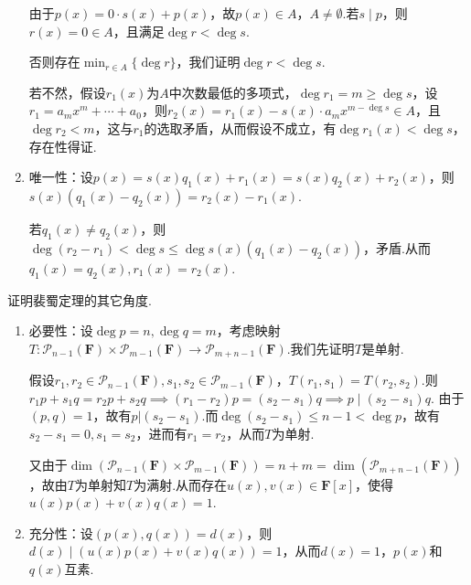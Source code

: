\begin{exercise}
\begin{exgroup}
\begin{answer}
\begin{enumerate}
                由于$p(x)=0\cdot s(x)+p(x)$，故$p(x)\in A$，$A\neq \emptyset$.若$s\mid p$，则$r(x)=0\in A$，且满足$\deg r<\deg s$.

                否则存在$\displaystyle \min_{r\in A}\{\deg r\}$，我们证明$\deg r<\deg s$.

                若不然，假设$r_1(x)$为$A$中次数最低的多项式，$\deg r_1=m\ge \deg s$，设$r_1=a_mx^m+\cdots+a_0$，则$r_2(x)=r_1(x)-s(x)\cdot a_mx^{m-\deg s}\in A$，且$\deg r_2 <m$，这与$r_1$的选取矛盾，从而假设不成立，有$\deg r_1(x)<\deg s$，存在性得证.
                \item 唯一性：设$p(x)=s(x)q_1(x)+r_1(x)=s(x)q_2(x)+r_2(x)$，则$s(x)(q_1(x)-q_2(x))=r_2(x)-r_1(x)$.

                若$q_1(x)\neq q_2(x)$，则$\deg (r_2-r_1)<\deg s\le \deg s(x)(q_1(x)-q_2(x))$，矛盾.从而$q_1(x)=q_2(x),r_1(x)=r_2(x)$.
            \end{enumerate}
        \end{answer}
        \item 证明裴蜀定理的其它角度.
        \begin{answer}
            \begin{enumerate}
                \item 必要性：设$\deg p=n,\deg q=m$，考虑映射$T:\mathcal{P}_{n-1}(\mathbf{F})\times\mathcal{P}_{m-1}(\mathbf{F})\rightarrow \mathcal{P}_{m+n-1}(\mathbf{F})$.我们先证明$T$是单射.

                假设$r_1,r_2\in\mathcal{P}_{n-1}(\mathbf{F}),s_1,s_2\in\mathcal{P}_{m-1}(\mathbf{F})$，$T(r_1,s_1)=T(r_2,s_2)$.则$r_1p+s_1q=r_2p+s_2q \implies (r_1-r_2)p=(s_2-s_1)q\implies p\mid(s_2-s_1)q$.
                由于$(p,q)=1$，故有$p|(s_2-s_1)$.而$\deg (s_2-s_1)\leqslant n-1 <\deg p$，故有$s_2-s_1=0,s_1=s_2$，进而有$r_1=r_2$，从而$T$为单射.

                又由于$\dim(\mathcal{P}_{n-1}(\mathbf{F})\times\mathcal{P}_{m-1}(\mathbf{F}))=n+m=\dim(\mathcal{P}_{m+n-1}(\mathbf{F}))$，故由$T$为单射知$T$为满射.从而存在$u(x),v(x)\in\mathbf{F}[x]$，使得$u(x)p(x)+v(x)q(x)=1$.
                \item 充分性：设$(p(x),q(x))=d(x)$，则$d(x)\mid (u(x)p(x)+v(x)q(x))=1$，从而$d(x)=1$，$p(x)$和$q(x)$互素.
            \end{enumerate}

        \end{answer}
    \end{exgroup}
\end{exercise}
